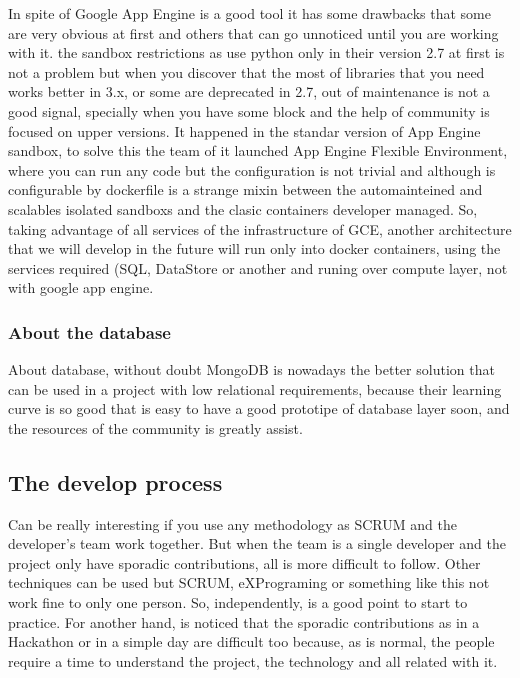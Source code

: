 In spite of Google App Engine is a good tool it has some drawbacks that some are
very obvious at first and others that can go unnoticed until you are working with it.
the sandbox restrictions as use python only in their version 2.7 at first is not
a problem but when you discover that the most of libraries that you need works
better in 3.x, or some are deprecated in 2.7, out of maintenance is not a good
signal, specially when you have some block and the help of community is focused
on upper versions. It happened in the standar version of App Engine sandbox, to
solve this the team of it launched App Engine Flexible Environment, where you can
run any code but the configuration is not trivial and although is configurable by
dockerfile is a strange mixin between the automainteined and scalables isolated
sandboxs and the clasic containers developer managed.
\linebreak
\linebreak
\noindent So, taking advantage of all services of the infrastructure of GCE, another
architecture that we will develop in the future will run only into docker containers,
using the services required (SQL, DataStore or another and runing over compute layer,
not with google app engine.

\subsubsection{About the database}

About database, without doubt MongoDB is nowadays the better solution that
can be used in a project with low relational requirements, because their learning
curve is so good that is easy to have a good prototipe of database layer soon,
and the resources of the community is greatly assist.

\subsection{The develop process}

Can be really interesting if you use any methodology as SCRUM and the developer's
team work together. But when the team is a single developer and the project only
have sporadic contributions,
all is more difficult to follow. Other techniques can be used but SCRUM, eXPrograming
or something like this not work fine to only one person.
So, independently, is a good point to start to practice. For another hand, is
 noticed that the sporadic contributions as in a Hackathon or in a simple day are
 difficult too because, as is normal, the people require a time to understand the
 project, the technology and all related with it.

